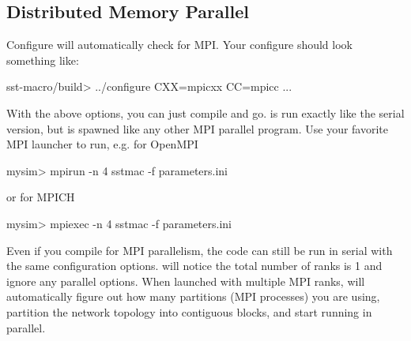 \subsection{Distributed Memory Parallel}
\label{subsec:mpiparallel}
Configure will automatically check for MPI.
Your configure should look something like:

\begin{ShellCmd}
sst-macro/build> ../configure CXX=mpicxx CC=mpicc ...
\end{ShellCmd}
With the above options, you can just compile and go.
\sstmacro is run exactly like the serial version, but is spawned like any other MPI parallel program.
Use your favorite MPI launcher to run, e.g. for OpenMPI

\begin{ShellCmd}
mysim> mpirun -n 4 sstmac -f parameters.ini
\end{ShellCmd}
or for MPICH

\begin{ShellCmd}
mysim> mpiexec -n 4 sstmac -f parameters.ini
\end{ShellCmd}

Even if you compile for MPI parallelism, the code can still be run in serial with the same configuration options.
\sstmacro will notice the total number of ranks is 1 and ignore any parallel options.
When launched with multiple MPI ranks, \sstmacro will automatically figure out how many partitions (MPI processes) 
you are using, partition the network topology into contiguous blocks, and start running in parallel.   


